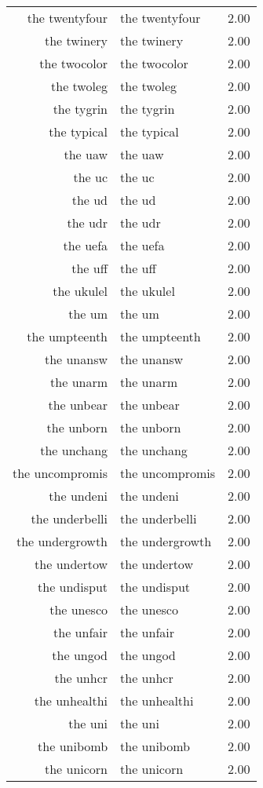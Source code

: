 \begin{table}[ht]
\begin{tabular}{rlr}
  the twentyfour & the twentyfour & 2.00 \\ 
  the twinery & the twinery & 2.00 \\ 
  the twocolor & the twocolor & 2.00 \\ 
  the twoleg & the twoleg & 2.00 \\ 
  the tygrin & the tygrin & 2.00 \\ 
  the typical & the typical & 2.00 \\ 
  the uaw & the uaw & 2.00 \\ 
  the uc & the uc & 2.00 \\ 
  the ud & the ud & 2.00 \\ 
  the udr & the udr & 2.00 \\ 
  the uefa & the uefa & 2.00 \\ 
  the uff & the uff & 2.00 \\ 
  the ukulel & the ukulel & 2.00 \\ 
  the um & the um & 2.00 \\ 
  the umpteenth & the umpteenth & 2.00 \\ 
  the unansw & the unansw & 2.00 \\ 
  the unarm & the unarm & 2.00 \\ 
  the unbear & the unbear & 2.00 \\ 
  the unborn & the unborn & 2.00 \\ 
  the unchang & the unchang & 2.00 \\ 
  the uncompromis & the uncompromis & 2.00 \\ 
  the undeni & the undeni & 2.00 \\ 
  the underbelli & the underbelli & 2.00 \\ 
  the undergrowth & the undergrowth & 2.00 \\ 
  the undertow & the undertow & 2.00 \\ 
  the undisput & the undisput & 2.00 \\ 
  the unesco & the unesco & 2.00 \\ 
  the unfair & the unfair & 2.00 \\ 
  the ungod & the ungod & 2.00 \\ 
  the unhcr & the unhcr & 2.00 \\ 
  the unhealthi & the unhealthi & 2.00 \\ 
  the uni & the uni & 2.00 \\ 
  the unibomb & the unibomb & 2.00 \\ 
  the unicorn & the unicorn & 2.00 \\ 

\end{tabular}
\end{table}
